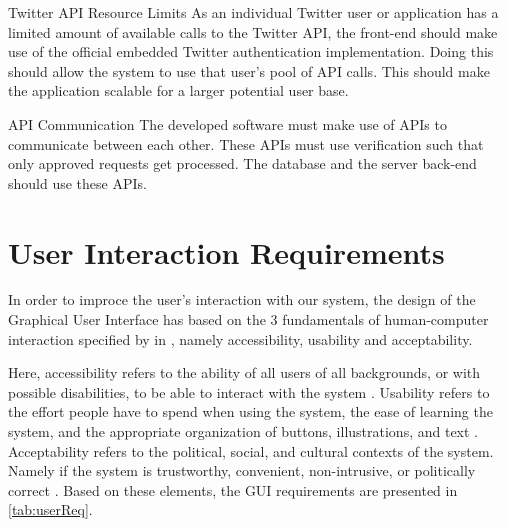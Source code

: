 \begin{requirement}{Twitter API Resource Limits}
As an individual Twitter user or application has a limited amount of available
calls to the Twitter API, the front-end should make use of the official embedded
Twitter authentication implementation. Doing this should allow the system to use
that user's pool of API calls. This should make the application scalable for a
larger potential user base.
\end{requirement}

\begin{requirement}{\ac{API} Communication}
The developed software must make use of \ac{API}s to communicate between each
other. These \ac{API}s must use verification such that only approved requests
get processed. The database and the server back-end should use these \ac{API}s.
\end{requirement}




\section{User Interaction Requirements}\label{sec:userReq}
In order to improce the user's interaction with our system, the design of the
Graphical User Interface has based on the 3 fundamentals of human-computer
interaction specified by \citeauthor{benyon2013designing} in
\citep[ch.4]{benyon2013designing}, namely accessibility, usability and
acceptability. 

Here, accessibility refers to the ability of all users of all backgrounds, or
with possible disabilities, to be able to interact with the system
\citep[p.77-80]{benyon2013designing}.
Usability refers to the effort people have to spend when using the system, the
ease of learning the system, and the appropriate organization of buttons,
illustrations, and text \citep[p.81-84]{benyon2013designing}. Acceptability
refers to the political, social, and cultural contexts of the system. Namely if
the system is trustworthy, convenient, non-intrusive, or politically correct
\citep[p.84-85]{benyon2013designing}. Based on these elements, the GUI
requirements are presented in \autoref{tab:userReq}.

